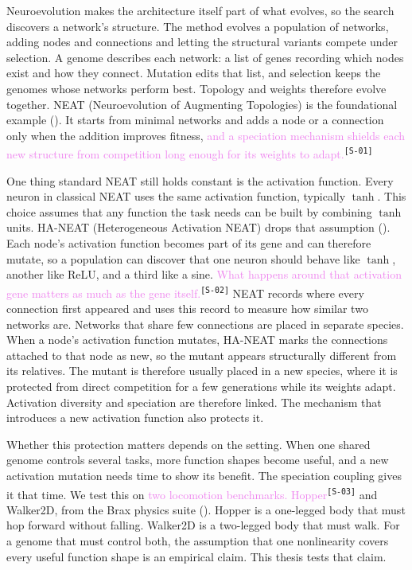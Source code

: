 \documentclass[12pt]{article}
\newcommand{\revID}[1]{\textsuperscript{\scriptsize\texttt{[#1]}}}
\newcommand{\revStyle}[2]{\textcolor{violet}{#2}\revID{#1}}   %
\begin{document}
Neuroevolution makes the architecture itself part of what evolves, so the search discovers a network's structure.
The method evolves a population of networks, adding nodes and connections and letting the structural variants compete under selection.
A genome describes each network: a list of genes recording which nodes exist and how they connect.
Mutation edits that list, and selection keeps the genomes whose networks perform best.
Topology and weights therefore evolve together.
NEAT (Neuroevolution of Augmenting Topologies) is the foundational example (\cite{stanley_evolving_2002}).
It starts from minimal networks and adds a node or a connection only when the addition improves fitness, \revStyle{S-01}{and a speciation mechanism shields each new structure from competition long enough for its weights to adapt.}


One thing standard NEAT still holds constant is the activation function.
Every neuron in classical NEAT uses the same activation function, typically $\tanh$.
This choice assumes that any function the task needs can be built by combining $\tanh$ units.
HA-NEAT (Heterogeneous Activation NEAT) drops that assumption (\cite{hagg_evolving_2017}).
Each node's activation function becomes part of its gene and can therefore mutate, so a population can discover that one neuron should behave like $\tanh$, another like ReLU, and a third like a sine.
\revStyle{S-02}{What happens around that activation gene matters as much as the gene itself.}
NEAT records where every connection first appeared and uses this record to measure how similar two networks are. Networks that share few connections are placed in separate species.
When a node's activation function mutates, HA-NEAT marks the connections attached to that node as new, so the mutant appears structurally different from its relatives.
The mutant is therefore usually placed in a new species, where it is protected from direct competition for a few generations while its weights adapt.
Activation diversity and speciation are therefore linked. The mechanism that introduces a new activation function also protects it.


Whether this protection matters depends on the setting.
When one shared genome controls several tasks, more function shapes become useful, and a new activation mutation needs time to show its benefit.
The speciation coupling gives it that time.
We test this on \revStyle{S-03}{two locomotion benchmarks. Hopper} and Walker2D, from the Brax physics suite (\cite{freeman_brax_2021}).
Hopper is a one-legged body that must hop forward without falling. Walker2D is a two-legged body that must walk.
For a genome that must control both, the assumption that one nonlinearity covers every useful function shape is an empirical claim.
This thesis tests that claim.
\end{document}
